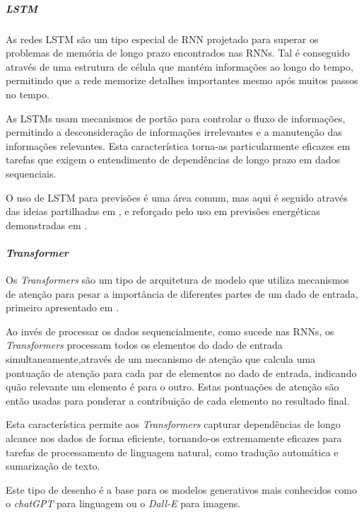 \subparagraph{LSTM\label{se:lstms_sec}}
\text{ }  \par

As redes \gls{LSTM} são um tipo especial de \gls{RNN} projetado para superar os problemas de memória de longo prazo encontrados nas \gls{RNN}s. Tal é conseguido através de uma estrutura de célula que mantém informações ao longo do tempo, permitindo que a rede memorize detalhes importantes mesmo após muitos passos no tempo.\par
As \gls{LSTM}s usam mecanismos de portão para controlar o fluxo de informações, permitindo a desconsideração de informações irrelevantes e a manutenção das informações relevantes. Esta característica torna-as particularmente eficazes em tarefas que exigem o entendimento de dependências de longo prazo em dados sequenciais.\par


O uso de \gls{LSTM} para previsões é uma área comum, mas aqui é seguido através das ideias partilhadas em \cite{Hewamalage2021}, e reforçado pelo uso em previsões energéticas demonstradas em \cite{Costa2022}.\par


\paragraph{\textit{Transformer}\label{se:transformer_sec}}
\text{ }  \par

Os \textit{Transformers} são um tipo de arquitetura de modelo que utiliza mecanismos de atenção para pesar a importância de diferentes partes de um dado de entrada, primeiro apresentado em \cite{Vaswani2017}.\par
Ao invés de processar os dados sequencialmente, como sucede nas RNNs, os \textit{Transformers} processam todos os elementos do dado de entrada simultaneamente,através de um mecanismo de atenção que calcula uma pontuação de atenção para cada par de elementos no dado de entrada, indicando quão relevante um elemento é para o outro. Estas pontuações de atenção são então usadas para ponderar a contribuição de cada elemento no resultado final.\par
Esta característica permite aos \textit{Transformers} capturar dependências de longo alcance nos dados de forma eficiente, tornando-os extremamente eficazes para tarefas de processamento de linguagem natural, como tradução automática e sumarização de texto.\par
Este tipo de desenho é a base para os modelos generativos mais conhecidos como o \textit{chatGPT} para linguagem ou o \textit{Dall-E} para imagens.\par



